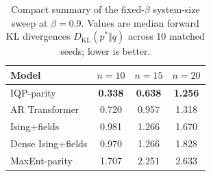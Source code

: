 \begin{table}[t]
\centering
\caption{
Compact summary of the fixed-$\beta$ system-size sweep at $\beta=0.9$.
Values are median forward KL divergences $D_{\mathrm{KL}}(p^*\Vert q)$ across
10 matched seeds; lower is better.
}
\label{tab:appendix_n_sweep_compact}
\begin{tabular}{lccc}
\toprule
Model & $n=10$ & $n=15$ & $n=20$ \\
\midrule
IQP-parity & \textbf{0.338} & \textbf{0.638} & \textbf{1.256} \\
AR Transformer & 0.720 & 0.957 & 1.318 \\
Ising+fields & 0.981 & 1.266 & 1.670 \\
Dense Ising+fields & 0.970 & 1.266 & 1.828 \\
MaxEnt-parity & 1.707 & 2.251 & 2.633 \\
\bottomrule
\end{tabular}
\end{table}
